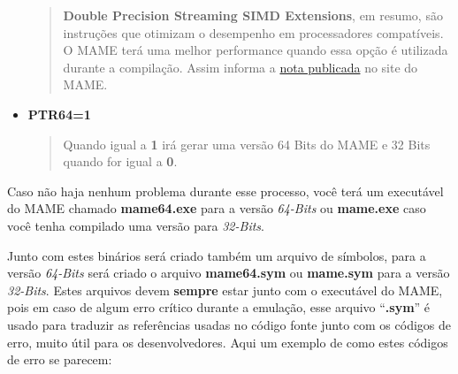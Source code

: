 \documentclass[letterpaper,10pt,brazil]{sphinxmanual}
\begin{document}
\begin{itemize}
\begin{quote}
\textbf{Double Precision Streaming SIMD Extensions}, em resumo, são
instruções que otimizam o desempenho em processadores
compatíveis. O MAME terá uma melhor performance quando essa
opção é utilizada durante a compilação.
Assim informa a \href{https://www.mamedev.org/?p=451}{nota publicada} no site do MAME.
\end{quote}

\item {} 
\textbf{PTR64=1}
\begin{quote}

Quando igual a \textbf{1} irá gerar uma versão 64 Bits do MAME e 32
Bits quando for igual a \textbf{0}.
\end{quote}

\end{itemize}

Caso não haja nenhum problema durante esse processo, você terá um
executável do MAME chamado \textbf{mame64.exe} para a versão \emph{64-Bits} ou
\textbf{mame.exe} caso você tenha compilado uma versão para \emph{32-Bits}.

Junto com estes binários será criado também um arquivo de símbolos,
para a versão \emph{64-Bits} será criado o arquivo \textbf{mame64.sym} ou
\textbf{mame.sym} para a versão \emph{32-Bits}. Estes arquivos devem \textbf{sempre}
estar junto com o executável do MAME, pois em caso de algum erro crítico
durante a emulação, esse arquivo ``\textbf{.sym}'' é usado para traduzir as
referências usadas no código fonte junto com os códigos de erro, muito
útil para os desenvolvedores. Aqui um exemplo de como estes códigos de
erro se parecem:
\end{document}
